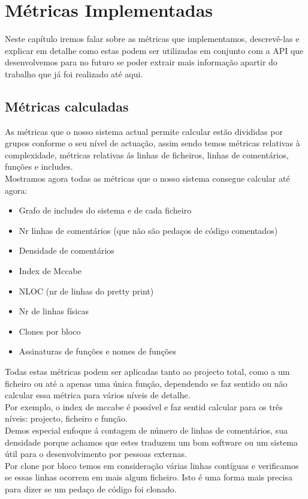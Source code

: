 \newcommand{\metricsins}{\mathbin{>\mkern-7mu\circ\mkern-9mu>}}
\newcommand{\metricscat}{\mathbin{>\mkern-7mu+\mkern-11mu>}}
\chapter{Métricas Implementadas}\label{chap:metricasapi}
\minitoc

Neste capítulo iremos falar sobre as métricas que implementamos, descrevê-las
e explicar em detalhe como estas podem ser utilizadas em conjunto com a API
que desenvolvemos para no futuro se poder extrair mais informação apartir
do trabalho que já foi realizado até aqui.

\section{Métricas calculadas}
As métricas que o nosso sistema actual permite calcular estão divididas por
grupos conforme o seu nível de actuação, assim sendo temos métricas
relativas à complexidade, métricas relativas ás linhas de ficheiros,
linhas de comentários, funções e includes.\\

Mostramos agora todas as métricas que o nosso sistema consegue calcular até agora:
\begin{itemize}
\item Grafo de includes do sistema e de cada ficheiro
\item Nr linhas de comentários (que não são pedaços de código comentados)
\item Densidade de comentários
\item Index de Mccabe
\item NLOC (nr de linhas do pretty print)
\item Nr de linhas físicas
\item Clones por bloco
\item Assinaturas de funções e nomes de funções
\end{itemize}

Todas estas métricas podem ser aplicadas tanto ao projecto total, como
a um ficheiro ou até a apenas uma única função, dependendo se faz sentido
ou não calcular essa métrica para vários níveis de detalhe.\\
Por exemplo, o index de mccabe é possível e faz sentid calcular para
os três níveis: projecto, ficheiro e função.\\

Demos especial enfoque á contagem de número de linhas de comentários, sua densidade
porque achamos que estes traduzem um bom software ou um sistema útil para o
desenvolvimento por pessoas externas.\\
Por clone por bloco temos em consideração várias linhas contíguas e verificamos
se essas linhas ocorrem em mais algum ficheiro. Isto é uma forma mais precisa
para dizer se um pedaço de código foi clonado.

